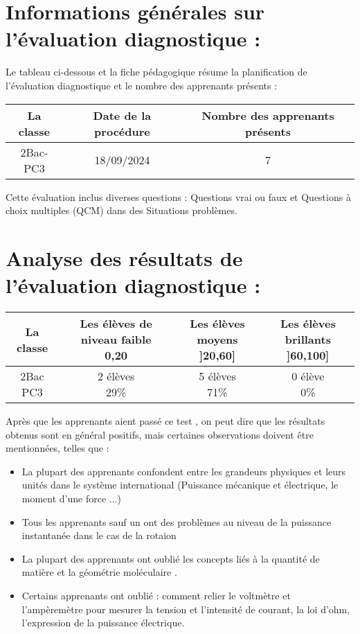 \documentclass[12pt]{article}
\begin{document}
\section{Informations générales sur l’évaluation diagnostique :  }
Le tableau ci-dessous et la fiche pédagogique résume la planification de l’évaluation diagnostique et le nombre des apprenants présents :
\begin{center}
  \begin{tabular}{|c|c|c|}
	  \hline
	  La classe & Date de la procédure & Nombre des apprenants présents\\\hline
	  2Bac-PC3 & 18/09/2024 & 7\\\hline
\end{tabular}
\end{center}

Cette évaluation inclus diverses questions : Questions vrai ou faux et Questions à choix multiples (QCM) dans des Situations problèmes.
\section{Analyse des résultats de l’évaluation diagnostique : }

\begin{center}
  \begin{tabular}{|c|c|c|c|}
	  \hline
La classe & \makecell{Les élèves de niveau faible \\ 0,20} & \makecell{Les élèves moyens \\ ]20,60]}& \makecell{Les élèves brillants \\  ]60,100]} \\\hline
2Bac PC3 & \makecell{2 élèves \\ 29\%} & \makecell{5 élèves \\ 71\%}& \makecell{0 élève \\ 0\%} \\\hline
\end{tabular}
\end{center}


Après que les apprenants aient passé ce test , on peut dire que les résultats obtenus sont en général positifs, mais certaines observations doivent être mentionnées, telles que :

\begin{itemize}
	\item La plupart des apprenants confondent entre les grandeurs physiques et leurs unités dans le système international (Puissance mécanique et électrique, le moment d'une force ...)
	\item Tous les apprenants sauf un ont des problèmes au niveau de la puissance instantanée dans le cas de la rotaion 

	\item  La plupart des apprenants ont oublié les concepts liés à la quantité de matière et la géométrie moléculaire . 
	\item Certains apprenants ont oublié : comment relier le voltmètre et l’ampèremètre pour mesurer la tension et l’intensité de courant,  la loi d’ohm, l’expression de la puissance électrique.
\end{itemize}
\end{document}
